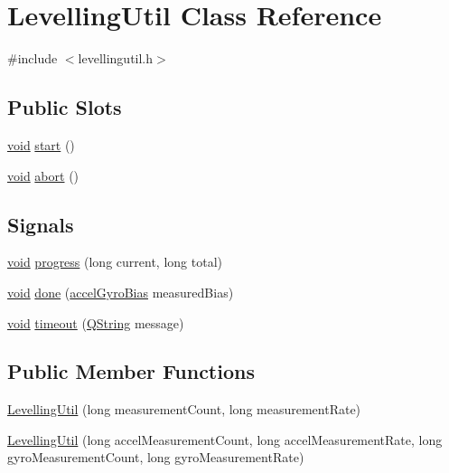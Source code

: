 \hypertarget{class_levelling_util}{\section{\-Levelling\-Util \-Class \-Reference}
\label{class_levelling_util}
}


{\ttfamily \#include $<$levellingutil.\-h$>$}

\subsection*{\-Public \-Slots}
\begin{DoxyCompactItemize}
\item 
\hyperlink{group___u_a_v_objects_plugin_ga444cf2ff3f0ecbe028adce838d373f5c}{void} \hyperlink{group___levelling_util_gadeda2d2af8921e86d9d28baa731bdee1}{start} ()
\item 
\hyperlink{group___u_a_v_objects_plugin_ga444cf2ff3f0ecbe028adce838d373f5c}{void} \hyperlink{group___levelling_util_ga0fda00c22049a8b2e594de88d8155ad7}{abort} ()
\end{DoxyCompactItemize}
\subsection*{\-Signals}
\begin{DoxyCompactItemize}
\item 
\hyperlink{group___u_a_v_objects_plugin_ga444cf2ff3f0ecbe028adce838d373f5c}{void} \hyperlink{group___levelling_util_gab523cee804f97da56e83162210546c36}{progress} (long current, long total)
\item 
\hyperlink{group___u_a_v_objects_plugin_ga444cf2ff3f0ecbe028adce838d373f5c}{void} \hyperlink{group___levelling_util_ga7fde9c70306e392dd49fef6c2f17f983}{done} (\hyperlink{structaccel_gyro_bias}{accel\-Gyro\-Bias} measured\-Bias)
\item 
\hyperlink{group___u_a_v_objects_plugin_ga444cf2ff3f0ecbe028adce838d373f5c}{void} \hyperlink{group___levelling_util_gac10890045336d643555fb7bc687e6d0a}{timeout} (\hyperlink{group___u_a_v_objects_plugin_gab9d252f49c333c94a72f97ce3105a32d}{\-Q\-String} message)
\end{DoxyCompactItemize}
\subsection*{\-Public \-Member \-Functions}
\begin{DoxyCompactItemize}
\item 
\hyperlink{group___levelling_util_ga01074f8582e6874acc1a566e55f30b53}{\-Levelling\-Util} (long measurement\-Count, long measurement\-Rate)
\item 
\hyperlink{group___levelling_util_ga7112024f171b944816a5c7cdeab07642}{\-Levelling\-Util} (long accel\-Measurement\-Count, long accel\-Measurement\-Rate, long gyro\-Measurement\-Count, long gyro\-Measurement\-Rate)
\end{DoxyCompactItemize}



